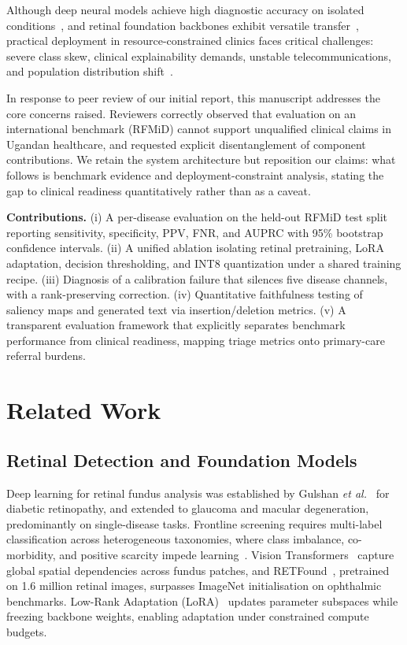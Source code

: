 \documentclass[11pt]{IEEEtran}
\begin{document}
Although deep neural models achieve high diagnostic accuracy on isolated conditions~\cite{gulshan2016},
and retinal foundation backbones exhibit versatile transfer~\cite{retfound2023}, practical deployment
in resource-constrained clinics faces critical challenges: severe class skew, clinical explainability
demands, unstable telecommunications, and population distribution shift~\cite{beede2020,wiens2019}.

In response to peer review of our initial report, this manuscript addresses the core concerns raised.
Reviewers correctly observed that evaluation on an international benchmark (RFMiD) cannot support
unqualified clinical claims in Ugandan healthcare, and requested explicit disentanglement of component
contributions. We retain the system architecture but reposition our claims: what follows is benchmark
evidence and deployment-constraint analysis, stating the gap to clinical readiness quantitatively rather
than as a caveat.

\textbf{Contributions.} (i) A per-disease evaluation on the held-out RFMiD test split reporting
sensitivity, specificity, PPV, FNR, and AUPRC with 95\% bootstrap confidence intervals. (ii) A unified
ablation isolating retinal pretraining, LoRA adaptation, decision thresholding, and INT8 quantization
under a shared training recipe. (iii) Diagnosis of a calibration failure that silences five disease
channels, with a rank-preserving correction. (iv) Quantitative faithfulness testing of saliency maps
and generated text via insertion/deletion metrics. (v) A transparent evaluation framework that explicitly
separates benchmark performance from clinical readiness, mapping triage metrics onto primary-care referral burdens.

\section{Related Work}

\subsection{Retinal Detection and Foundation Models}
Deep learning for retinal fundus analysis was established by Gulshan \emph{et al.}~\cite{gulshan2016}
for diabetic retinopathy, and extended to glaucoma and macular degeneration, predominantly on single-disease
tasks. Frontline screening requires multi-label classification across heterogeneous taxonomies, where class
imbalance, co-morbidity, and positive scarcity impede learning~\cite{rfmid2021}. Vision
Transformers~\cite{vit2021} capture global spatial dependencies across fundus patches, and RETFound~\cite{retfound2023},
pretrained on 1.6 million retinal images, surpasses ImageNet initialisation on ophthalmic benchmarks.
Low-Rank Adaptation (LoRA)~\cite{lora2022} updates parameter subspaces while freezing backbone weights,
enabling adaptation under constrained compute budgets.
\end{document}
